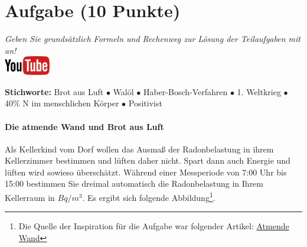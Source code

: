 \documentclass[a4paper, 9pt]{scrartcl}\usepackage[]{graphicx}\usepackage[]{xcolor}
\begin{document}
 
\clearpage

\section{Aufgabe \hfill (10 Punkte)}

\textit{Geben Sie grundsätzlich Formeln und Rechenweg zur L{\"o}sung der
  Teilaufgaben mit an!} \\[1Ex]

\hfill\href{https://youtu.be/4-dSaPMhK9s}{\includegraphics[width =
  2cm]{img/youtube}} %
\hspace{2Ex}

{\tiny\textbf{Stichworte:} Brot aus Luft $\bullet$ Walöl $\bullet$ Haber-Bosch-Verfahren $\bullet$ 1. Weltkrieg $\bullet$ 40\% N im menschlichen Körper $\bullet$ Positivist}

\paragraph{Die atmende Wand und Brot aus Luft}



Als Kellerkind vom Dorf wollen das Ausmaß der Radonbelastung in ihrem Kellerzimmer bestimmen und
lüften daher nicht. Spart dann auch Energie und lüften wird sowieso überschätzt. Während einer Messperiode von 7:00 Uhr bis
15:00 bestimmen Sie dreimal automatisch die Radonbelastung in
Ihrem Kellerraum in $Bq/m^3$. Es ergibt sich folgende Abbildung\footnote{Die Quelle der Inspiration
  für die Aufgabe war folgender Artikel:
  \href{https://de.wikipedia.org/wiki/Atmende_Wand}{Atmende Wand}}.
\end{document}
